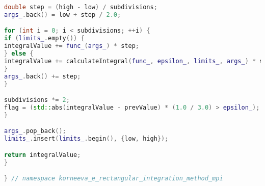 \documentclass[12pt]{article}
\begin{document}
\begin{lstlisting}[language=C++]
double step = (high - low) / subdivisions;
args_.back() = low + step / 2.0;

for (int i = 0; i < subdivisions; ++i) {
if (limits_.empty()) {
integralValue += func_(args_) * step; 
} else {
integralValue += calculateIntegral(func_, epsilon_, limits_, args_) * step;
}
args_.back() += step;
}

subdivisions *= 2;
flag = (std::abs(integralValue - prevValue) * (1.0 / 3.0) > epsilon_);
}

args_.pop_back();
limits_.insert(limits_.begin(), {low, high});

return integralValue;
}

} // namespace korneeva_e_rectangular_integration_method_mpi
\end{lstlisting}
\end{document}
